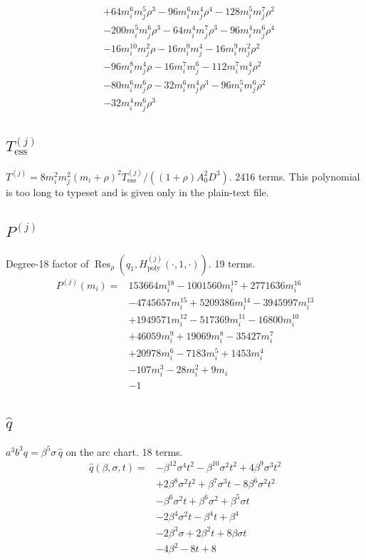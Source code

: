 {\begin{align*}
&+64m_i^{6} m_j^{5} \rho^{3}-96m_i^{6} m_j^{4} \rho^{4}-128m_i^{5} m_j^{7} \rho^{2}\\
&-200m_i^{5} m_j^{6} \rho^{3}-64m_i^{4} m_j^{7} \rho^{3}-96m_i^{4} m_j^{6} \rho^{4}\\
&-16m_i^{10} m_j^{2} \rho-16m_i^{9} m_j^{4}-16m_i^{9} m_j^{2} \rho^{2}\\
&-96m_i^{8} m_j^{4} \rho-16m_i^{7} m_j^{6}-112m_i^{7} m_j^{4} \rho^{2}\\
&-80m_i^{6} m_j^{6} \rho-32m_i^{6} m_j^{4} \rho^{3}-96m_i^{5} m_j^{6} \rho^{2}\\
&-32m_i^{4} m_j^{6} \rho^{3}
\end{align*}
}

\subsection*{$T^{(j)}_{\mathrm{ess}}$}
$T^{(j)}=8m_i^2m_j^2(m_i+\rho)^2T^{(j)}_{\mathrm{ess}}/((1+\rho)A_0^2D^3)$. 2416 terms.
This polynomial is too long to typeset and is given only in the plain-text file.

\subsection*{$P^{(j)}$}
Degree-18 factor of $\operatorname{Res}_\rho(q_1,H^{(j)}_{\mathrm{poly}}(\cdot,1,\cdot))$. 19 terms.
{\small
\begin{align*}
P^{(j)}(m_i)={}&153664m_i^{18}-1001560m_i^{17}+2771636m_i^{16}\\
&-4745657m_i^{15}+5209386m_i^{14}-3945997m_i^{13}\\
&+1949571m_i^{12}-517369m_i^{11}-16800m_i^{10}\\
&+46059m_i^{9}+19069m_i^{8}-35427m_i^{7}\\
&+20978m_i^{6}-7183m_i^{5}+1453m_i^{4}\\
&-107m_i^{3}-28m_i^{2}+9m_i\\
&-1
\end{align*}
}

\subsection*{$\hat q$}
$a^3b^3q=\beta^5\sigma\,\hat q$ on the arc chart. 18 terms.
{\small
\begin{align*}
\hat q(\beta,\sigma,t)={}&-\beta^{12} \sigma^{4} t^{2}-\beta^{10} \sigma^{2} t^{2}+4\beta^{9} \sigma^{3} t^{2}\\
&+2\beta^{8} \sigma^{2} t^{2}+\beta^{7} \sigma^{3} t-8\beta^{6} \sigma^{2} t^{2}\\
&-\beta^{6} \sigma^{2} t+\beta^{6} \sigma^{2}+\beta^{5} \sigma t\\
&-2\beta^{4} \sigma^{2} t-\beta^{4} t+\beta^{4}\\
&-2\beta^{3} \sigma+2\beta^{2} t+8\beta \sigma t\\
&-4\beta^{2}-8t+8
\end{align*}
}

